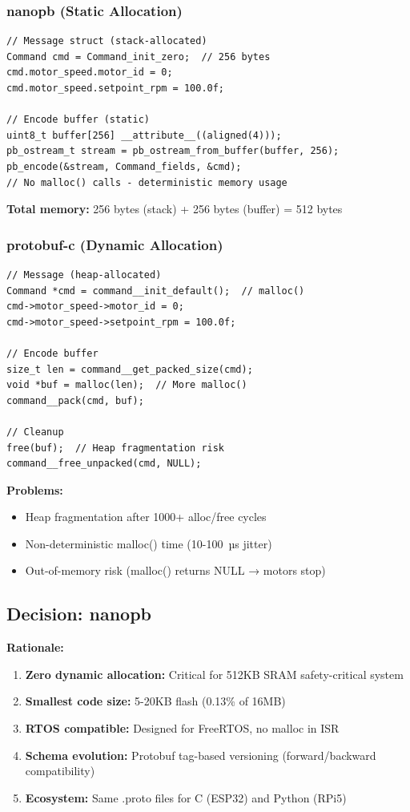 \subsubsection{nanopb (Static Allocation)}

\begin{lstlisting}[caption={nanopb Memory Usage}]
// Message struct (stack-allocated)
Command cmd = Command_init_zero;  // 256 bytes
cmd.motor_speed.motor_id = 0;
cmd.motor_speed.setpoint_rpm = 100.0f;

// Encode buffer (static)
uint8_t buffer[256] __attribute__((aligned(4)));
pb_ostream_t stream = pb_ostream_from_buffer(buffer, 256);
pb_encode(&stream, Command_fields, &cmd);
// No malloc() calls - deterministic memory usage
\end{lstlisting}

\textbf{Total memory:} 256 bytes (stack) + 256 bytes (buffer) = 512 bytes

\subsubsection{protobuf-c (Dynamic Allocation)}

\begin{lstlisting}[caption={protobuf-c Memory Usage}]
// Message (heap-allocated)
Command *cmd = command__init_default();  // malloc()
cmd->motor_speed->motor_id = 0;
cmd->motor_speed->setpoint_rpm = 100.0f;

// Encode buffer
size_t len = command__get_packed_size(cmd);
void *buf = malloc(len);  // More malloc()
command__pack(cmd, buf);

// Cleanup
free(buf);  // Heap fragmentation risk
command__free_unpacked(cmd, NULL);
\end{lstlisting}

\textbf{Problems:}
\begin{itemize}
    \item Heap fragmentation after 1000+ alloc/free cycles
    \item Non-deterministic malloc() time (10-100~µs jitter)
    \item Out-of-memory risk (malloc() returns NULL → motors stop)
\end{itemize}

\subsection{Decision: nanopb}

\textbf{Rationale:}
\begin{enumerate}
    \item \textbf{Zero dynamic allocation:} Critical for 512KB SRAM safety-critical system
    \item \textbf{Smallest code size:} 5-20KB flash (0.13\% of 16MB)
    \item \textbf{RTOS compatible:} Designed for FreeRTOS, no malloc in ISR
    \item \textbf{Schema evolution:} Protobuf tag-based versioning (forward/backward compatibility)
    \item \textbf{Ecosystem:} Same .proto files for C (ESP32) and Python (RPi5)
\end{enumerate}


